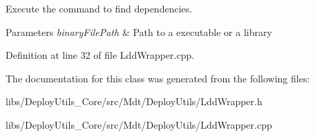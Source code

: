 Execute the command to find dependencies. 


\begin{DoxyParams}{Parameters}
{\em binary\+File\+Path} & Path to a executable or a library \\
\hline
\end{DoxyParams}


Definition at line 32 of file Ldd\+Wrapper.\+cpp.



The documentation for this class was generated from the following files\+:\begin{DoxyCompactItemize}
\item 
libs/\+Deploy\+Utils\+\_\+\+Core/src/\+Mdt/\+Deploy\+Utils/Ldd\+Wrapper.\+h\item 
libs/\+Deploy\+Utils\+\_\+\+Core/src/\+Mdt/\+Deploy\+Utils/Ldd\+Wrapper.\+cpp\end{DoxyCompactItemize}
